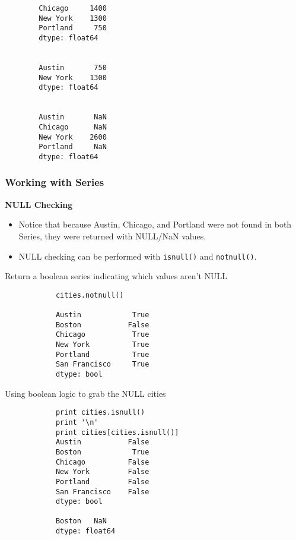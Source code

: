 \documentclass[KSmainSlides.tex]{subfiles}
\begin{document}
	\begin{frame}[fragile]
		\begin{verbatim}
		Chicago     1400
		New York    1300
		Portland     750
		dtype: float64
		
		
		Austin       750
		New York    1300
		dtype: float64
		
		
		Austin       NaN
		Chicago      NaN
		New York    2600
		Portland     NaN
		dtype: float64
		\end{verbatim}
	\end{frame}
	\begin{frame}[fragile]
		\frametitle{Working with Series}
		\textbf{NULL Checking}
		\begin{itemize}
			
			\item Notice that because Austin, Chicago, and Portland were not found in both Series, they were returned with NULL/NaN values.
			
			\item NULL checking can be performed with \texttt{isnull()} and \texttt{notnull()}.
		\end{itemize}		
	\end{frame}
	\begin{frame}[fragile]
		Return a boolean series indicating which values aren't NULL
		
		\begin{framed}
			\begin{verbatim}
			cities.notnull()
			
			Austin            True
			Boston           False
			Chicago           True
			New York          True
			Portland          True
			San Francisco     True
			dtype: bool
			\end{verbatim}
		\end{framed}
	\end{frame}
	\begin{frame}[fragile]
		Using boolean logic to grab the NULL cities
		\begin{framed}
			\begin{verbatim}
			print cities.isnull()
			print '\n'
			print cities[cities.isnull()]
			Austin           False
			Boston            True
			Chicago          False
			New York         False
			Portland         False
			San Francisco    False
			dtype: bool
			
			Boston   NaN
			dtype: float64
			\end{verbatim}
		\end{framed}
	\end{frame}
\end{document}
